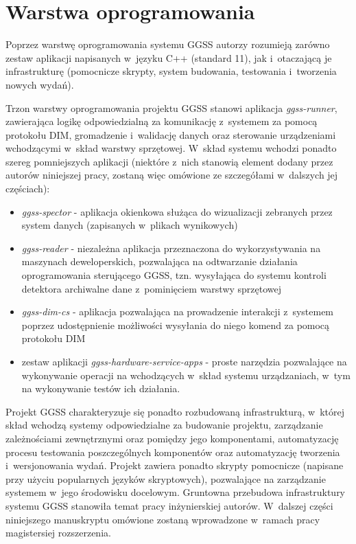 \section{Warstwa oprogramowania}
Poprzez warstwę oprogramowania systemu GGSS autorzy rozumieją zarówno zestaw aplikacji napisanych w~języku C++ (standard 11), jak i~otaczającą je infrastrukturę (pomocnicze skrypty, system budowania, testowania i~tworzenia nowych wydań). 


Trzon warstwy oprogramowania projektu GGSS stanowi aplikacja \emph{ggss-runner}, zawierająca logikę odpowiedzialną za komunikację z~systemem za pomocą protokołu DIM, gromadzenie i~walidację danych oraz sterowanie urządzeniami wchodzącymi w~skład warstwy sprzętowej. W~skład systemu wchodzi ponadto szereg pomniejszych aplikacji (niektóre z~nich stanowią element dodany przez autorów niniejszej pracy, zostaną więc omówione ze szczegółami w~dalszych jej częściach):
\begin{itemize}
    \item \emph{ggss-spector} - aplikacja okienkowa służąca do wizualizacji zebranych przez system danych (zapisanych w~plikach wynikowych)
    \item \emph{ggss-reader} - niezależna aplikacja \cite{PodsiadloInz} przeznaczona do wykorzystywania na maszynach deweloperskich, pozwalająca na odtwarzanie działania oprogramowania sterującego GGSS, tzn. wysyłająca do systemu kontroli detektora archiwalne dane z~pominięciem warstwy sprzętowej
    \item \emph{ggss-dim-cs} - aplikacja pozwalająca na prowadzenie interakcji z~systemem poprzez udostępnienie możliwości wysyłania do niego komend za pomocą protokołu DIM
    \item zestaw aplikacji \emph{ggss-hardware-service-apps} - proste narzędzia pozwalające na wykonywanie operacji na wchodzących w~skład systemu urządzaniach, w~tym na wykonywanie testów ich działania. 
\end{itemize}


Projekt GGSS charakteryzuje się ponadto rozbudowaną infrastrukturą, w~której skład wchodzą systemy odpowiedzialne za budowanie projektu, zarządzanie zależnościami zewnętrznymi oraz pomiędzy jego komponentami, automatyzację procesu testowania poszczególnych komponentów oraz automatyzację tworzenia i~wersjonowania wydań. Projekt zawiera ponadto skrypty pomocnicze (napisane przy użyciu popularnych języków skryptowych), pozwalające na zarządzanie systemem w~jego środowisku docelowym. Gruntowna przebudowa infrastruktury systemu GGSS stanowiła temat pracy inżynierskiej autorów. W~dalszej części niniejszego manuskryptu omówione zostaną wprowadzone w~ramach pracy magistersiej rozszerzenia.


